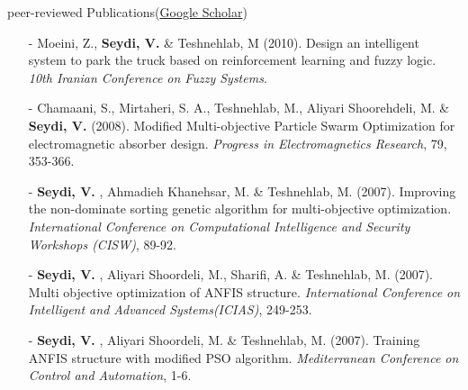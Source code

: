 \documentclass{resume} %
\begin{document}
\begin{rSection}{peer-reviewed Publications\small{(\href{https://scholar.google.com/citations?hl=en&user=L2z7NuwAAAAJ&view_op=list_works}{Google Scholar})}}
\begin{itemize}
\item[-] Moeini, Z., \textbf{Seydi, V.} \faEnvelopeO \hspace{1ex}  \& Teshnehlab, M (2010). Design an intelligent system to park the truck based on reinforcement learning and fuzzy logic. \textit{10th Iranian Conference on Fuzzy Systems}.
\item[-] Chamaani, S., Mirtaheri, S. A., Teshnehlab, M., Aliyari Shoorehdeli, M. \& \textbf{Seydi, V.} (2008). Modified Multi-objective Particle Swarm Optimization for electromagnetic absorber design. \textit{Progress in Electromagnetics Research}, 79, 353-366.
\item[-] \textbf{Seydi, V.} \faEnvelopeO \hspace{1ex} , Ahmadieh Khanehsar, M. \& Teshnehlab, M. (2007). Improving the non-dominate sorting genetic algorithm for multi-objective optimization. \textit{International Conference on Computational Intelligence and Security Workshops (CISW)}, 89-92.
\item[-] \textbf{Seydi, V.} \faEnvelopeO \hspace{1ex} , Aliyari Shoordeli, M., Sharifi, A. \& Teshnehlab, M. (2007). Multi objective optimization of ANFIS structure. \textit{International Conference on Intelligent and Advanced Systems(ICIAS)}, 249-253.
\item[-] \textbf{Seydi, V.} \faEnvelopeO \hspace{1ex} , Aliyari Shoordeli, M. \& Teshnehlab, M. (2007). Training ANFIS structure with modified PSO algorithm. \textit{Mediterranean Conference on Control and Automation}, 1-6.	
\end{itemize}		
\end{rSection}
\end{document}
